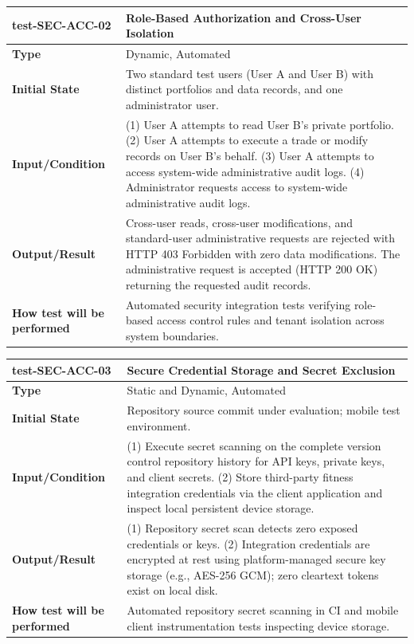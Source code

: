 \documentclass[12pt, titlepage]{article}
\begin{document}
\noindent\begin{tabularx}{\textwidth}{>{\raggedright\arraybackslash}p{3.5cm}X}
  \toprule
  \textbf{test-SEC-ACC-02} & \textbf{Role-Based Authorization and Cross-User Isolation}\\
  \midrule
  \textbf{Type} & Dynamic, Automated\\
  \textbf{Initial State} & Two standard test users (User A and User B) with distinct portfolios and data records, and one administrator user.\\
  \textbf{Input/Condition} & (1) User A attempts to read User B's private portfolio. (2) User A attempts to execute a trade or modify records on User B's behalf. (3) User A attempts to access system-wide administrative audit logs. (4) Administrator requests access to system-wide administrative audit logs.\\
  \textbf{Output/Result} & Cross-user reads, cross-user modifications, and standard-user administrative requests are rejected with HTTP 403 Forbidden with zero data modifications. The administrative request is accepted (HTTP 200 OK) returning the requested audit records.\\
  \textbf{How test will be performed} & Automated security integration tests verifying role-based access control rules and tenant isolation across system boundaries.\\
  \bottomrule
\end{tabularx}

\vspace{1em}

\noindent\begin{tabularx}{\textwidth}{>{\raggedright\arraybackslash}p{3.5cm}X}
  \toprule
  \textbf{test-SEC-ACC-03} & \textbf{Secure Credential Storage and Secret Exclusion}\\
  \midrule
  \textbf{Type} & Static and Dynamic, Automated\\
  \textbf{Initial State} & Repository source commit under evaluation; mobile test environment.\\
  \textbf{Input/Condition} & (1) Execute secret scanning on the complete version control repository history for API keys, private keys, and client secrets. (2) Store third-party fitness integration credentials via the client application and inspect local persistent device storage.\\
  \textbf{Output/Result} & (1) Repository secret scan detects zero exposed credentials or keys. (2) Integration credentials are encrypted at rest using platform-managed secure key storage (e.g., AES-256 GCM); zero cleartext tokens exist on local disk.\\
  \textbf{How test will be performed} & Automated repository secret scanning in CI and mobile client instrumentation tests inspecting device storage.\\
  \bottomrule
\end{tabularx}
\end{document}
